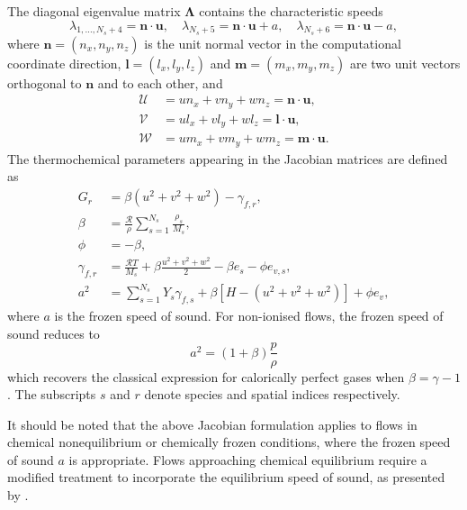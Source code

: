 The diagonal eigenvalue matrix $\mathbf{\Lambda}$ contains the characteristic speeds
\begin{equation}
\lambda_{1,\ldots,N_s+4} = \mathbf{n} \cdot \mathbf{u}, \quad \lambda_{N_s+5} = \mathbf{n} \cdot \mathbf{u} + a, \quad \lambda_{N_s+6} = \mathbf{n} \cdot \mathbf{u} - a,
\end{equation}
where $\mathbf{n} = (n_x, n_y, n_z)$ is the unit normal vector in the computational coordinate direction, $\mathbf{l} = (l_x, l_y, l_z)$ and $\mathbf{m} = (m_x, m_y, m_z)$ are two unit vectors orthogonal to $\mathbf{n}$ and to each other, and
\begin{align}
\mathcal{U} &= un_x + vn_y + wn_z = \mathbf{n} \cdot \mathbf{u}, \\
\mathcal{V} &= ul_x + vl_y + wl_z = \mathbf{l} \cdot \mathbf{u}, \\
\mathcal{W} &= um_x + vm_y + wm_z = \mathbf{m} \cdot \mathbf{u}.
\end{align}
The thermochemical parameters appearing in the Jacobian matrices are defined as
\begin{align}
G_r &= \beta(u^2+v^2+w^2) - \gamma_{f,r}, \\[0.8em]
\beta &= \frac{\mathcal{R}}{\rho}\sum_{s=1}^{N_s}\frac{\rho_s}{M_s}, \\[0.8em]
\phi &= -\beta, \\[0.8em]
\gamma_{f,r} &= \frac{\mathcal{R}T}{M_s} + \beta\frac{u^2+v^2+w^2}{2} - \beta e_s - \phi e_{v,s}, \\[0.8em]
a^2 &= \sum_{s=1}^{N_s}Y_s\gamma_{f,s} + \beta\left[H - (u^2+v^2+w^2)\right] + \phi e_v,
\end{align}
where $a$ is the frozen speed of sound. For non-ionised flows, the frozen speed of sound reduces to
\begin{equation}
a^2 = (1 + \beta)\frac{p}{\rho}
\end{equation}
which recovers the classical expression for calorically perfect gases when $\beta = \gamma - 1$. The subscripts $s$ and $r$ denote species and spatial indices respectively.

It should be noted that the above Jacobian formulation applies to flows in chemical nonequilibrium or chemically frozen conditions, where the frozen speed of sound $a$ is appropriate. Flows approaching chemical equilibrium require a modified treatment to incorporate the equilibrium speed of sound, as presented by \citet{LiouEtAl1990}. 

